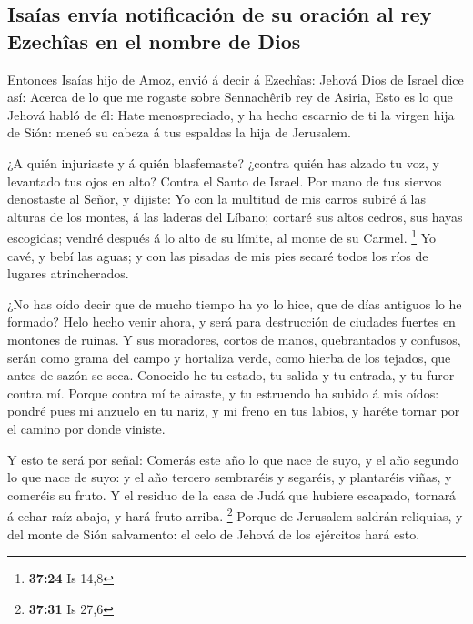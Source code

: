 \hypertarget{isauxedas-envuxeda-notificaciuxf3n-de-su-oraciuxf3n-al-rey-ezechuxeeas-en-el-nombre-de-dios}{%
\subsection{Isaías envía notificación de su oración al rey Ezechîas en
el nombre de
Dios}\label{isauxedas-envuxeda-notificaciuxf3n-de-su-oraciuxf3n-al-rey-ezechuxeeas-en-el-nombre-de-dios}}

 Entonces Isaías hijo de Amoz, envió á decir á Ezechîas:
Jehová Dios de Israel dice así: Acerca de lo que me rogaste sobre
Sennachêrib rey de Asiria,  Esto es lo que Jehová habló
de él: Hate menospreciado, y ha hecho escarnio de ti la virgen hija de
Sión: meneó su cabeza á tus espaldas la hija de Jerusalem.

 ¿A quién injuriaste y á quién blasfemaste? ¿contra quién
has alzado tu voz, y levantado tus ojos en alto? Contra el Santo de
Israel.  Por mano de tus siervos denostaste al Señor, y
dijiste: Yo con la multitud de mis carros subiré á las alturas de los
montes, á las laderas del Líbano; cortaré sus altos cedros, sus hayas
escogidas; vendré después á lo alto de su límite, al monte de su Carmel.
\footnote{\textbf{37:24} Is 14,8}  Yo cavé, y bebí las
aguas; y con las pisadas de mis pies secaré todos los ríos de lugares
atrincherados.

 ¿No has oído decir que de mucho tiempo ha yo lo hice,
que de días antiguos lo he formado? Helo hecho venir ahora, y será para
destrucción de ciudades fuertes en montones de ruinas.  Y
sus moradores, cortos de manos, quebrantados y confusos, serán como
grama del campo y hortaliza verde, como hierba de los tejados, que antes
de sazón se seca.  Conocido he tu estado, tu salida y tu
entrada, y tu furor contra mí.  Porque contra mí te
airaste, y tu estruendo ha subido á mis oídos: pondré pues mi anzuelo en
tu nariz, y mi freno en tus labios, y haréte tornar por el camino por
donde viniste.

 Y esto te será por señal: Comerás este año lo que nace
de suyo, y el año segundo lo que nace de suyo: y el año tercero
sembraréis y segaréis, y plantaréis viñas, y comeréis su fruto.
 Y el residuo de la casa de Judá que hubiere escapado,
tornará á echar raíz abajo, y hará fruto arriba. \footnote{\textbf{37:31}
  Is 27,6}  Porque de Jerusalem saldrán reliquias, y del
monte de Sión salvamento: el celo de Jehová de los ejércitos hará esto.

